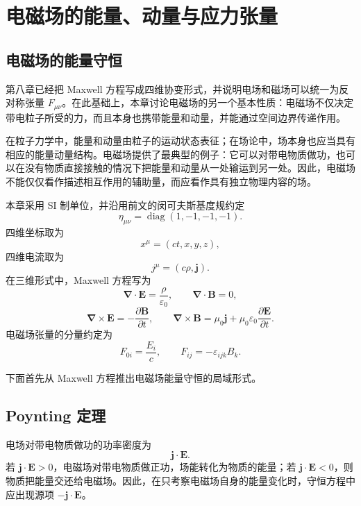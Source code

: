 \chapter{电磁场的能量、动量与应力张量}

\section{电磁场的能量守恒}

第八章已经把 Maxwell 方程写成四维协变形式，并说明电场和磁场可以统一为反对称张量 $F_{\mu\nu}$。在此基础上，本章讨论电磁场的另一个基本性质：电磁场不仅决定带电粒子所受的力，而且本身也携带能量和动量，并能通过空间边界传递作用。

在粒子力学中，能量和动量由粒子的运动状态表征；在场论中，场本身也应当具有相应的能量动量结构。电磁场提供了最典型的例子：它可以对带电物质做功，也可以在没有物质直接接触的情况下把能量和动量从一处输运到另一处。因此，电磁场不能仅仅看作描述相互作用的辅助量，而应看作具有独立物理内容的场。

本章采用 SI 制单位，并沿用前文的闵可夫斯基度规约定
\[
\eta_{\mu\nu}
=
\operatorname{diag}(1,-1,-1,-1).
\]
四维坐标取为
\[
x^{\mu}
=
(ct,x,y,z),
\]
四维电流取为
\[
j^{\mu}
=
(c\rho,\bm{j}).
\]
在三维形式中，Maxwell 方程写为
\[
\bm{\nabla}\cdot\bm{E}
=
\frac{\rho}{\varepsilon_{0}},
\qquad
\bm{\nabla}\cdot\bm{B}=0,
\]
\[
\bm{\nabla}\times\bm{E}
=
-\frac{\partial\bm{B}}{\partial t},
\qquad
\bm{\nabla}\times\bm{B}
=
\mu_{0}\bm{j}
+
\mu_{0}\varepsilon_{0}
\frac{\partial\bm{E}}{\partial t}.
\]
电磁场张量的分量约定为
\[
F_{0i}
=
\frac{E_{i}}{c},
\qquad
F_{ij}
=
-\varepsilon_{ijk}B_{k}.
\]

下面首先从 Maxwell 方程推出电磁场能量守恒的局域形式。

\section{Poynting 定理}

电场对带电物质做功的功率密度为
\[
\bm{j}\cdot\bm{E}.
\]
若 $\bm{j}\cdot\bm{E}>0$，电磁场对带电物质做正功，场能转化为物质的能量；若 $\bm{j}\cdot\bm{E}<0$，则物质把能量交还给电磁场。因此，在只考察电磁场自身的能量变化时，守恒方程中应出现源项 $-\bm{j}\cdot\bm{E}$。

